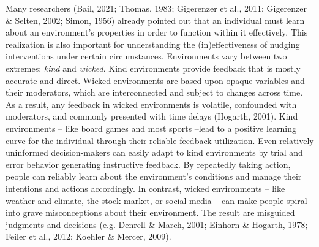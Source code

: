\documentclass[reflection, authordate,issue]{jote-new-article}
\begin{document}
Many researchers (Bail, 2021; Thomas, 1983; Gigerenzer et al., 2011; Gigerenzer \& Selten, 2002; Simon, 1956) already pointed out that an individual must learn about an environment’s properties in order to function within it effectively. This realization is also important for understanding the (in)effectiveness of nudging interventions under certain circumstances. Environments vary between two extremes: \emph{kind }and \emph{wicked}. Kind environments provide feedback that is mostly accurate and direct. Wicked environments are based upon opaque variables and their moderators, which are interconnected and subject to changes across time. As a result, any feedback in wicked environments is volatile, confounded with moderators, and commonly presented with time delays (Hogarth, 2001). Kind environments – like board games and most sports –lead to a positive learning curve for the individual through their reliable feedback utilization. Even relatively uninformed decision-makers can easily adapt to kind environments by trial and error behavior generating instructive feedback. By repeatedly taking action, people can reliably learn about the environment’s conditions and manage their intentions and actions accordingly. In contrast, wicked environments – like weather and climate, the stock market, or social media – can make people spiral into grave misconceptions about their environment. The result are misguided judgments and decisions (e.g. Denrell \& March, 2001; Einhorn \& Hogarth, 1978; Feiler et al., 2012; Koehler \& Mercer, 2009).
\end{document}
